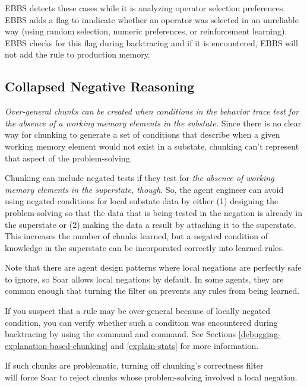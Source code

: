 EBBS detects these cases while it is analyzing operator selection preferences. EBBS adds a flag to inndicate whether an operator was selected in an unreliable way (using random selection, numeric preferences, or reinforcement learning). EBBS checks for this flag during backtracing and if it is encountered, EBBS will not add the rule to production memory.

\subsection{Collapsed Negative Reasoning}
\label{CHUNKING-subtleties-overgeneralization}

\emph{Over-general chunks can be created when conditions in the behavior trace test for the absence of a working memory elements in the substate.} Since there is no clear way for chunking to generate a set of conditions that describe when a given working memory element would not exist in a substate, chunking can't represent that aspect of the problem-solving.

Chunking can include negated tests if they test for \textit{the absence of working memory elements in the superstate, though}.  So, the agent engineer can avoid using negated conditions for local substate data by either (1) designing the problem-solving so that the data that is being tested in the negation is already in the superstate or (2) making the data a result by attaching it to the superstate. This increases the number of chunks learned, but a negated condition of knowledge in the superstate can be incorporated correctly into learned rules.

Note that there are agent design patterns where local negations are perfectly safe to ignore, so Soar allows local negations by default.  In some agents, they are common enough that turning the filter on prevents any rules from being learned.

If you suspect that a rule may be over-general because of locally negated condition, you can verify whether such a condition was encountered during backtracing by using the  command and  command.  See Sections \ref{debugging-explanation-based-chunking} and \ref{explain-stats} for more information.

If such chunks are problematic, turning off chunking's correctness filter \\
 will force Soar to reject chunks whose problem-solving involved a local negation.

